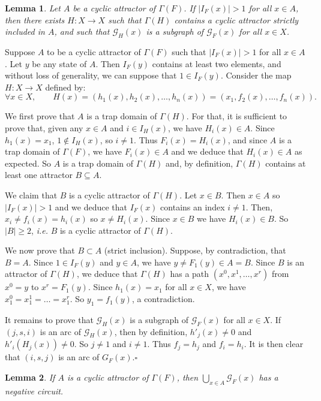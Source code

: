 \documentclass[11pt]{article}
\newtheorem{lemma}{Lemma}
\def\proof{\noindent{\bf Proof --~}}
\def\cqfd{\hfill$\square$}
\def\G{\mathscr{G}}
\begin{document}
\begin{lemma}\label{lem:induction}
Let $A$ be a cyclic attractor of $\Gamma(F)$. If $|I_F(x)|>1$ for all
$x\in A$, then there exists $H:X\to X$ such that $\Gamma(H)$ contains
a cyclic attractor strictly included in $A$, and such that $\G_H(x)$
is a subgraph of $\G_F(x)$ for all $x\in X$.
\end{lemma}

\proof 
Suppose $A$ to be a cyclic attractor of $\Gamma(F)$ such that
$|I_F(x)|>1$ for all $x\in A$. Let $y$ be any state of $A$. Then
$I_F(y)$ contains at least two elements, and without loss of
generality, we can suppose that $1\in I_F(y)$. Consider the map
$H:X\to X$ defined by:
\[
\forall x\in X,\qquad 
H(x)=(h_1(x),h_2(x),\dots,h_n(x))=
(x_1,f_2(x),\dots,f_n(x)).
\]

We first prove that $A$ is a trap domain of $\Gamma(H)$. For that, it
is sufficient to prove that, given any $x\in A$ and $i\in I_H(x)$, we
have $H_i(x)\in A$. Since $h_1(x)=x_1$, $1\not\in I_H(x)$, so $i\neq
1$. Thus $F_i(x)=H_i(x)$, and since $A$ is a trap domain of
$\Gamma(F)$, we have $F_i(x)\in A$ and we deduce that $H_i(x)\in A$ as
expected. So $A$ is a trap domain of $\Gamma(H)$ and, by definition,
$\Gamma(H)$ contains at least one attractor $B\subseteq A$.

We claim that $B$ is a cyclic attractor of $\Gamma(H)$. Let $x\in
B$. Then $x\in A$ so $|I_F(x)|>1$ and we deduce that $I_F(x)$ contains
an index $i\neq 1$. Then, $x_i\neq f_i(x)=h_i(x)$ so $x\neq
H_i(x)$. Since $x\in B$ we have $H_i(x)\in B$. So $|B|\geq 2$,
{\emph{i.e.}} $B$ is a cyclic attractor of $\Gamma(H)$.

We now prove that $B\subset A$ (strict inclusion). Suppose, by
contradiction, that $B=A$. Since $1\in I_F(y)$ and $y\in A$, we have
$y\neq F_1(y)\in A=B$. Since $B$ is an attractor of $\Gamma(H)$, we
deduce that $\Gamma(H)$ has a path $(x^0,x^1,\dots,x^r)$ from $x^0=y$
to $x^r=F_1(y)$. Since $h_1(x)=x_1$ for all $x\in X$, we have
$x^0_1=x^1_1=\dots=x^r_1$. So $y_1=f_1(y)$, a contradiction.

It remains to prove that $\G_H(x)$ is a subgraph of $\G_F(x)$ for all
$x\in X$.  If $(j,s,i)$ is an arc of $\G_H(x)$, then by definition,
$h'_j(x)\neq 0$ and $h'_i(H_j(x))\neq 0$. So $j\neq 1$ and $i\neq
1$. Thus $f_j=h_j$ and $f_i=h_i$. It is then clear that $(i,s,j)$ is
an arc of $G_F(x)$.\cqfd


\begin{lemma}\label{lem:main}
If $A$ is a cyclic attractor of $\Gamma(F)$, then $\bigcup_{x\in
A}\G_F(x)$ has a negative circuit.
\end{lemma}
\end{document}

